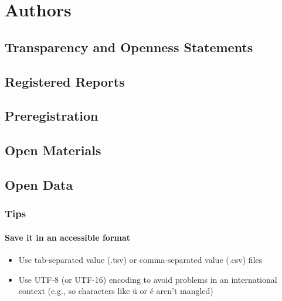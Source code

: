\documentclass[
  oneside]{book}
\providecommand{\tightlist}{%
  \setlength{\itemsep}{0pt}\setlength{\parskip}{0pt}}
\begin{document}
\hypertarget{part-authors}{%
\part{Authors}\label{part-authors}}

\hypertarget{transparency-and-openness-statements-1}{%
\chapter{Transparency and Openness Statements}\label{transparency-and-openness-statements-1}}

\hypertarget{registered-reports-1}{%
\chapter{Registered Reports}\label{registered-reports-1}}

\hypertarget{preregistration-1}{%
\chapter{Preregistration}\label{preregistration-1}}

\hypertarget{open-materials-1}{%
\chapter{Open Materials}\label{open-materials-1}}

\hypertarget{open-data-1}{%
\chapter{Open Data}\label{open-data-1}}

\hypertarget{author-data-tips}{%
\section{Tips}\label{author-data-tips}}

\hypertarget{save-it-in-an-accessible-format}{%
\subsection{Save it in an accessible format}\label{save-it-in-an-accessible-format}}

\begin{itemize}
\tightlist
\item
  Use tab-separated value (.tsv) or comma-separated value (.csv) files
\item
  Use UTF-8 (or UTF-16) encoding to avoid problems in an international context (e.g., so characters like ü or é aren't mangled)
\end{itemize}
\end{document}

